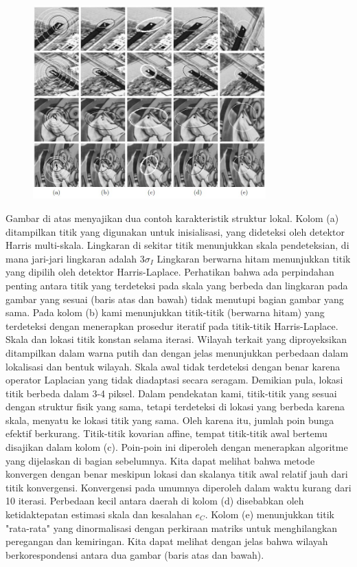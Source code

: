 \begin{figure}
  \centering{}
  \includegraphics[width=0.8\textwidth]{gambar/Affine invariant interest point detection.jpg}
  \caption{}
\end{figure}

Gambar di atas menyajikan dua contoh karakteristik struktur lokal. Kolom (a) ditampilkan 
titik yang digunakan untuk inisialisasi, yang dideteksi oleh detektor Harris multi-skala.
Lingkaran di sekitar titik menunjukkan skala pendeteksian, di mana jari-jari lingkaran adalah \(3\sigma_{I}\) Lingkaran berwarna hitam menunjukkan
titik yang dipilih oleh detektor Harris-Laplace. Perhatikan bahwa ada perpindahan penting antara titik yang terdeteksi pada skala yang berbeda dan lingkaran pada gambar yang sesuai (baris atas dan bawah) tidak menutupi bagian gambar yang sama. Pada kolom (b) kami menunjukkan titik-titik (berwarna hitam) yang terdeteksi dengan menerapkan prosedur iteratif pada titik-titik Harris-Laplace. Skala dan lokasi titik konstan selama iterasi. Wilayah terkait yang diproyeksikan ditampilkan dalam warna putih dan dengan jelas menunjukkan perbedaan dalam lokalisasi dan bentuk wilayah. Skala awal tidak terdeteksi dengan benar karena operator Laplacian yang tidak diadaptasi secara seragam. Demikian pula, lokasi titik berbeda dalam 3-4 piksel. Dalam pendekatan kami, titik-titik yang sesuai dengan struktur fisik yang sama, tetapi terdeteksi di lokasi yang berbeda karena skala, menyatu ke lokasi titik yang sama. Oleh karena itu, jumlah poin bunga efektif berkurang. Titik-titik kovarian affine, tempat titik-titik awal bertemu disajikan dalam kolom (c). Poin-poin ini diperoleh dengan menerapkan algoritme yang dijelaskan di bagian sebelumnya. Kita dapat melihat bahwa metode konvergen dengan benar meskipun lokasi dan skalanya
titik awal relatif jauh dari titik konvergensi. Konvergensi pada umumnya diperoleh dalam waktu kurang dari 10 iterasi. Perbedaan kecil antara daerah di kolom (d) disebabkan oleh ketidaktepatan estimasi skala dan kesalahan \(e_{C}\). Kolom (e) menunjukkan titik "rata-rata" yang dinormalisasi
dengan perkiraan matriks untuk menghilangkan peregangan dan kemiringan. Kita dapat melihat dengan jelas bahwa wilayah berkorespondensi antara dua gambar (baris atas dan bawah).